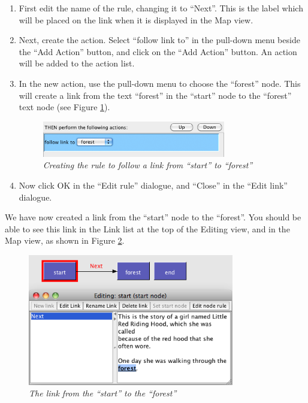 \documentclass{article}
\begin{document}
\begin{enumerate}
\item First edit the name of the rule, changing it to ``Next''. This is the
label which will be placed on the link when it is displayed in the Map view.

\item Next, create the action. Select ``follow link to'' in the pull-down menu
beside the ``Add Action'' button, and click on the ``Add Action'' button. An
action will be added to the action list.

\item In the new action, use the pull-down menu to choose the ``forest'' node.
This will create a link from the text ``forest'' in the ``start'' node to the
``forest'' text node (see Figure \ref{fig:create_action}).

\begin{figure}[ht]
  \centering
  \includegraphics[width=8cm]{images/hypedyn-tutorial-1-figure-8d}
  \caption{\textit{Creating the rule to follow a link from ``start'' to
  ``forest''}}
  \label{fig:create_action}
\end{figure} 

\item Now click OK in the ``Edit rule'' dialogue, and ``Close'' in the ``Edit
link'' dialogue.
\end{enumerate}

We have now created a link from the ``start'' node to the ``forest''. You
should be able to see this link in the Link list at the top of the Editing
view, and in the Map view, as shown in Figure \ref{fig:new_link_mapview}.
  
\begin{figure}[ht]
  \centering
  \includegraphics[width=9cm]{images/hypedyn-tutorial-1-figure-9}
  \caption{\textit{The link from the ``start'' to the ``forest''}}
  \label{fig:new_link_mapview}
\end{figure} 
\end{document}
